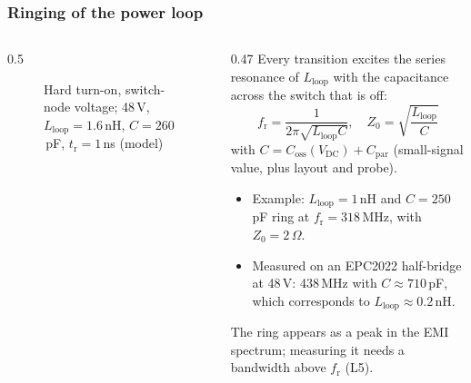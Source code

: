 \begin{frame}
	\frametitle{Ringing of the power loop}
	\begin{columns}[T]
		\begin{column}{0.5\textwidth}
			\begin{figure}
				\centering
				\caption{Hard turn-on, switch-node voltage; 48\,V, $L_\mathrm{loop}=1.6$\,nH, $C=260$\,pF, $t_\mathrm{r}=1$\,ns (model)}
			\end{figure}
		\end{column}
		\begin{column}{0.47\textwidth}
			\footnotesize
			Every transition excites the series resonance of $L_\mathrm{loop}$ with the capacitance across the switch that is off:
			\begin{equation*}
				f_\mathrm{r}=\frac{1}{2\pi\sqrt{L_\mathrm{loop}C}},\quad Z_0=\sqrt{\frac{L_\mathrm{loop}}{C}}
			\end{equation*}
			with $C=C_\mathrm{oss}(V_\mathrm{DC})+C_\mathrm{par}$ (small-signal value, plus layout and probe).
			\begin{itemize}
				\item Example: $L_\mathrm{loop}=1$\,nH and $C=250$\,pF ring at $f_\mathrm{r}=318$\,MHz, with $Z_0=2\,\Omega$.
				\item Measured on an EPC2022 half-bridge at 48\,V: 438\,MHz with $C\approx710$\,pF, which corresponds to $L_\mathrm{loop}\approx0.2$\,nH.
			\end{itemize}
			The ring appears as a peak in the EMI spectrum; measuring it needs a bandwidth above $f_\mathrm{r}$ (L5).
		\end{column}
	\end{columns}
\end{frame}

